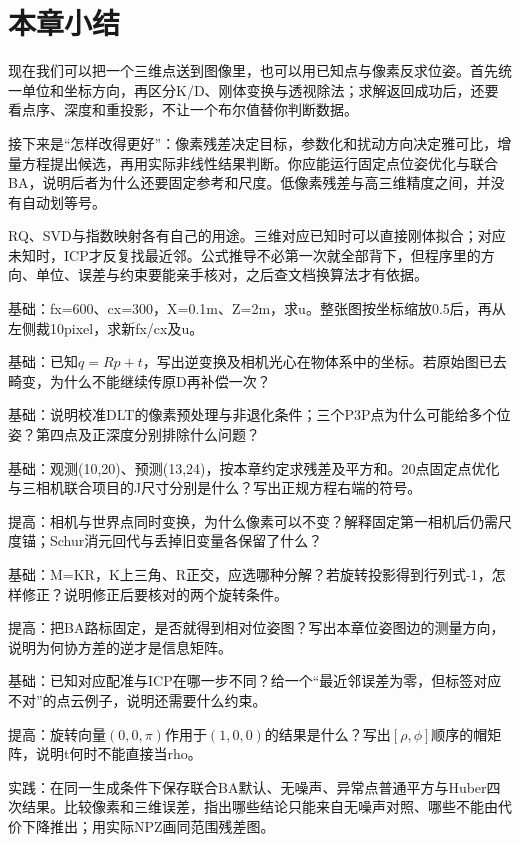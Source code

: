 \section{本章小结}
\begin{conclusion}
现在我们可以把一个三维点送到图像里，也可以用已知点与像素反求位姿。首先统一单位和坐标方向，再区分K/D、刚体变换与透视除法；求解返回成功后，还要看点序、深度和重投影，不让一个布尔值替你判断数据。

接下来是“怎样改得更好”：像素残差决定目标，参数化和扰动方向决定雅可比，增量方程提出候选，再用实际非线性结果判断。你应能运行固定点位姿优化与联合BA，说明后者为什么还要固定参考和尺度。低像素残差与高三维精度之间，并没有自动划等号。

RQ、SVD与指数映射各有自己的用途。三维对应已知时可以直接刚体拟合；对应未知时，ICP才反复找最近邻。公式推导不必第一次就全部背下，但程序里的方向、单位、误差与约束要能亲手核对，之后查文档换算法才有依据。
\end{conclusion}

\begin{problemset}
\item\label{prob:v2-ba-projection} 基础：fx=600、cx=300，X=0.1m、Z=2m，求u。整张图按坐标缩放0.5后，再从左侧裁10pixel，求新fx/cx及u。
\item\label{prob:v2-ba-frame} 基础：已知$q=Rp+t$，写出逆变换及相机光心在物体系中的坐标。若原始图已去畸变，为什么不能继续传原D再补偿一次？
\item\label{prob:v2-ba-pnp} 基础：说明校准DLT的像素预处理与非退化条件；三个P3P点为什么可能给多个位姿？第四点及正深度分别排除什么问题？
\item\label{prob:v2-ba-residual} 基础：观测(10,20)、预测(13,24)，按本章约定求残差及平方和。20点固定点优化与三相机联合项目的J尺寸分别是什么？写出正规方程右端的符号。
\item\label{prob:v2-ba-gauge} 提高：相机与世界点同时变换，为什么像素可以不变？解释固定第一相机后仍需尺度锚；Schur消元回代与丢掉旧变量各保留了什么？
\item\label{prob:v2-ba-matrix} 基础：M=KR，K上三角、R正交，应选哪种分解？若旋转投影得到行列式-1，怎样修正？说明修正后要核对的两个旋转条件。
\item\label{prob:v2-ba-graph} 提高：把BA路标固定，是否就得到相对位姿图？写出本章位姿图边的测量方向，说明为何协方差的逆才是信息矩阵。
\item\label{prob:v2-ba-icp} 基础：已知对应配准与ICP在哪一步不同？给一个“最近邻误差为零，但标签对应不对”的点云例子，说明还需要什么约束。
\item\label{prob:v2-ba-lie} 提高：旋转向量$(0,0,\pi)$作用于$(1,0,0)$的结果是什么？写出$[\rho,\phi]$顺序的帽矩阵，说明t何时不能直接当rho。
\item\label{prob:v2-ba-experiment} 实践：在同一生成条件下保存联合BA默认、无噪声、异常点普通平方与Huber四次结果。比较像素和三维误差，指出哪些结论只能来自无噪声对照、哪些不能由代价下降推出；用实际NPZ画同范围残差图。
\end{problemset}

